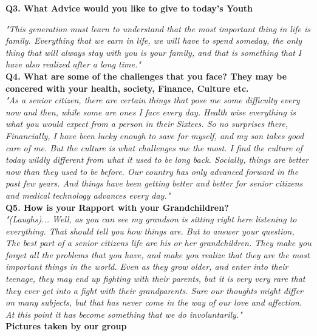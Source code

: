 \documentclass[11pt]{article}
\begin{document}
\textbf{Q3. What Advice would you like to give to today's Youth}

\textit{"This generation must learn to understand that the most important thing in life is family. Everything that we earn in life, we will 
have to spend someday, the only thing that will always stay with you is your family, and that is something that I have also realized after
a long time."}\\

\textbf{Q4. What are some of the challenges that you face? They may be concered with your health, society, Finance, Culture etc.}\\

\textit{"As a senior citizen, there are certain things that pose me some difficulty every now and then, while some are ones I face every day. 
Health wise everything is what you would expect from a person in their Sixtees. So no surprises there, Financially, I have been lucky enough to 
save for myself, and my son takes good care of me. But the culture is what challenges me the most. I find the culture of today wildly different
from what it used to be long back. Socially, things are better now than they used to be before. Our country has only advanced forward in the past few years. 
And things have been getting better and better for senior citizens and medical technology advances every day." }\\

\textbf{Q5. How is your Rapport with your Grandchildren?}\\

\textit{"(Laughs)... Well, as you can see my grandson is sitting right here listening to everything. That should tell you how things are. But to answer your question, 
The best part of a senior citizens life are his or her grandchildren. They make you forget all the problems that you have, and make you realize that they are the most 
important things in the world. Even as they grow older, and enter into their teenage, they may end up fighting with their parents, but it is very very rare that they ever
get into a fight with their grandparents. Sure our thoughts might differ on many subjects, but that has never come in the way of our love and affection. At this point it has become
something that we do involuntarily."}\\

\centering
\Large{\textbf{Pictures taken by our group}}
\end{document}
